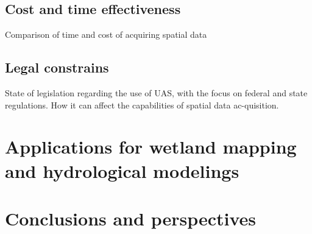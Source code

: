 \documentclass[final,3p,times,twocolumn]{elsarticle}
\begin{document}
\subsection{Cost and time effectiveness}
Comparison of time and cost of acquiring spatial data 
\subsection{Legal constrains}
State of legislation regarding the use of UAS, with the focus on federal and state regulations. How it can affect the capabilities of spatial data ac-quisition. 
\section{Applications for wetland mapping and hydrological modelings}
\section{Conclusions and perspectives}



%
%
%
%
%
%
%
%
%
%
%
%
%



\end{document}
